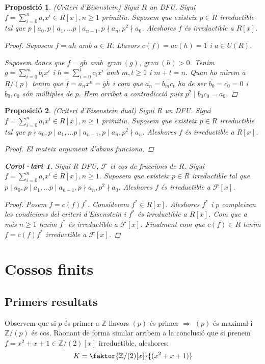 \documentclass[a4paper,11pt]{report}
\renewcommand{\div}{\mid}
\DeclareMathOperator{\grau}{grau}
\renewcommand{\bar}{\overline}
\newcommand{\im}{\Rightarrow}
\theoremstyle{theorem}
\newtheorem{proposicio}{\normalfont \sffamily\bfseries Proposició}[section]
\newtheorem{col}{\normalfont \sffamily\bfseries Corol·lari}[section]
\theoremstyle{definition}
\begin{document}
\begin{proposicio} (Criteri d'Eisenstein)
	Sigui $R$ un DFU. Sigui $f=\sum_{i=0}^{n}a_ix^i\in R[x],n \geq 1$ primitiu. Suposem que existeix $p\in R$ irreductible tal que $p\div a_0,p\div a_1,\ldots p\div a_{n-1},p\nmid a_n,p^2\nmid a_0$. Aleshores $f$ és irreductible a $R[x]$.
	\begin{proof}
		Suposem $f=ah$ amb $a\in R$. Llavors $c(f)=ac(h)=1$ i $a\in U(R)$.
		
		Suposem doncs que $f=gh$ amb $\grau(g),\grau(h)>0$. Tenim $g=\sum_{i=0}^{m}b_ix^i$ i $h=\sum_{i=0}^{t}c_ix^i$ amb $m,t\geq 1$ i $m+t=n$. Quan ho mirem a $R/(p)$ tenim que $\bar{f}=\bar{a_n}x^n=\bar{g}\bar{h}$ i com que $\bar{a_n}=\bar{b_mc_t}$ ha de ser $\bar{b_0}=\bar{c_0}=0$ i $b_0,c_0$ són múltiples de $p$. Hem arribat a contradicció puix $p^2\div b_0c_0=a_0$.
		
	\end{proof}
\end{proposicio}
\begin{proposicio}(Criteri d'Eisenstein dual)
Sigui $R$ un DFU. Sigui $f=\sum_{i=0}^{n}a_ix^i\in R[x],n \geq 1$ primitiu. Suposem que existeix $p\in R$ irreductible tal que $p\nmid a_0,p\div a_1,\ldots p\div a_{n-1},p\div a_n,p^2\nmid a_n$. Aleshores $f$ és irreductible a $R[x]$.
\begin{proof}
	El mateix argument d'abans funciona.
\end{proof}
\begin{col}
	Sigui $R$ DFU, $\mathcal{F}$ el cos de fraccions de $R$. Sigui $f=\sum_{i=0}^{n}a_ix^i\in R[x],n \geq 1$. Suposem que existeix $p\in R$ irreductible tal que $p\div a_0,p\div a_1,\ldots p\div a_{n-1},p\nmid a_n,p^2\nmid a_0$. Aleshores $f$ és irreductible a $\mathcal{F}[x]$.
	\begin{proof}
		Posem $f=c(f)f^*$. Considerem $f^*\in R[x]$. Aleshores $f^*$ i $p$ compleixen les condicions del criteri d'Eisenstein i $f^*$ és irreductible a $R[x]$. Com que a més $n\geq 1$ tenim $f^*$ és irreductible a $\mathcal{F}[x]$. Finalment com que $c(f)\in R$ tenim $f=c(f)f^*$ irreductible a $\mathcal{F}[x]$.
	\end{proof}
\end{col}
\end{proposicio}
\chapter{Cossos finits}
\section{Primers resultats}
Observem que si $p$ és primer a $\mathbb{Z}$ llavors $(p)$ és primer $\im$ $(p)$ és maximal i $\mathbb{Z}/(p)$ és cos. Raonant de forma similar arribem a la conclusió que si prenem $f=x^2+x+1\in \mathbb{Z}/(2)[x]$ irreductible, aleshores:
$$K=\faktor{\mathbb{Z}/(2)[x]}{(x^2+x+1)}$$
\end{document}
